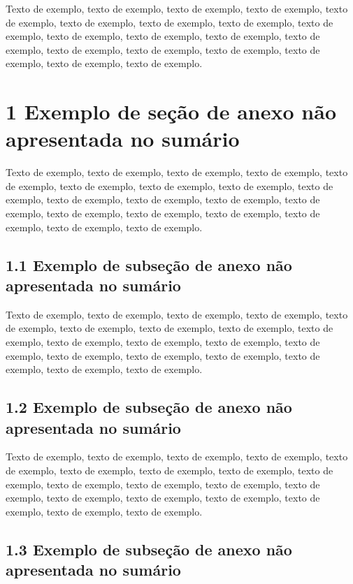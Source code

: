 \documentclass[
	12pt,				%
	oneside,			%
	a4paper,			%
	english,			%
	brazil				%
	]{abntex2ppgsi}
\begin{document}
\begin{anexosenv}
Texto de exemplo, texto de exemplo, texto de exemplo, texto de exemplo, texto de exemplo, texto de exemplo, texto de exemplo, texto de exemplo, texto de exemplo, texto de exemplo, texto de exemplo, texto de exemplo, texto de exemplo, texto de exemplo, texto de exemplo, texto de exemplo, texto de exemplo, texto de exemplo, texto de exemplo.

\section*{1 Exemplo de seção de anexo não apresentada no sumário}

Texto de exemplo, texto de exemplo, texto de exemplo, texto de exemplo, texto de exemplo, texto de exemplo, texto de exemplo, texto de exemplo, texto de exemplo, texto de exemplo, texto de exemplo, texto de exemplo, texto de exemplo, texto de exemplo, texto de exemplo, texto de exemplo, texto de exemplo, texto de exemplo, texto de exemplo.

\subsection*{1.1 Exemplo de subseção de anexo não apresentada no sumário}

Texto de exemplo, texto de exemplo, texto de exemplo, texto de exemplo, texto de exemplo, texto de exemplo, texto de exemplo, texto de exemplo, texto de exemplo, texto de exemplo, texto de exemplo, texto de exemplo, texto de exemplo, texto de exemplo, texto de exemplo, texto de exemplo, texto de exemplo, texto de exemplo, texto de exemplo.

\subsection*{1.2 Exemplo de subseção de anexo não apresentada no sumário}

Texto de exemplo, texto de exemplo, texto de exemplo, texto de exemplo, texto de exemplo, texto de exemplo, texto de exemplo, texto de exemplo, texto de exemplo, texto de exemplo, texto de exemplo, texto de exemplo, texto de exemplo, texto de exemplo, texto de exemplo, texto de exemplo, texto de exemplo, texto de exemplo, texto de exemplo.

\subsection*{1.3 Exemplo de subseção de anexo não apresentada no sumário}


\end{anexosenv}
\end{document}

